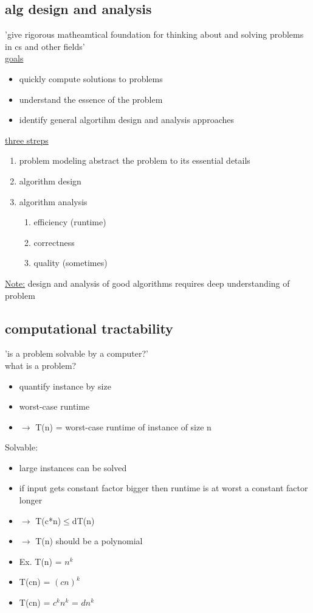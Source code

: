 \documentclass[a4paper]{article}
\newcommand{\bi}{\begin{itemize}}
\newcommand{\ei}{\end{itemize}}
\newcommand{\be}{\begin{enumerate}}
\newcommand{\ee}{\end{enumerate}}
\newcommand{\ra}{$\rightarrow$}
\begin{document}
    \subsection{alg design and analysis}
      'give rigorous matheamtical foundation for thinking about and solving
      problems in cs and other fields'\\
      \underline{goals}
      \bi
        \item quickly compute solutions to problems
        \item understand the essence of the problem
        \item identify general algortihm design and analysis approaches
      \ei
      \underline{three streps}
      \be
        \item problem modeling
          \subitem abstract the problem to its essential details
        \item algorithm design
        \item algorithm analysis
        \be
          \item efficiency (runtime)
          \item correctness
          \item quality (sometimes)
        \ee
      \ee
      \underline{Note:} design and analysis of good algorithms requires deep
      understanding of problem
    \subsection{computational tractability}
      'is a problem solvable by a computer?'\\
      what is a problem?
      \bi
        \item quantify instance by size
        \item worst-case runtime
        \item[\ra ] T(n) = worst-case runtime of instance of size n
      \ei
      Solvable:
      \bi
        \item large instances can be solved
        \item if input gets constant factor bigger then runtime is at worst a constant factor longer
        \item[\ra ] T(c*n)$\le$dT(n)
        \item[\ra ] T(n) should be a polynomial
        \item[Ex.] T(n) = $n^k$
        \item[] T(cn) = $(cn)^k$
        \item[] T(cn) = $c^kn^k$ = $dn^k$
      \ei
\end{document}
